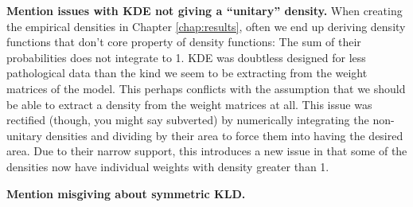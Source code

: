 \textbf{Mention issues with KDE not giving a ``unitary'' density.}
When creating the empirical densities in Chapter \ref{chap:results}, often we end up deriving 
density functions that don't core property of density functions: The sum of their probabilities 
does not integrate to 1. KDE was doubtless designed for less pathological data than the kind we
seem to be extracting from the weight matrices of the model. This perhaps conflicts with the 
assumption that we should be able to extract a density from the weight matrices at all. This issue
was rectified (though, you might say subverted) by numerically integrating the non-unitary densities
and dividing by their area to force them into having the desired area. Due to their narrow support,
this introduces a new issue in that some of the densities now have individual weights with density 
greater than 1.

\textbf{Mention misgiving about symmetric KLD.}
